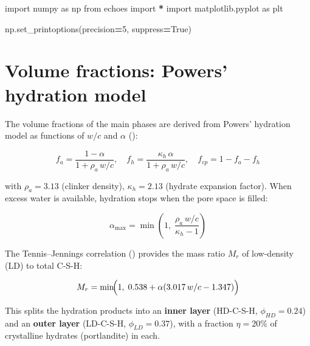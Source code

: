 \documentclass[
  a4paper,
  numbers=noendperiod,
  DIV=12]{scrreprt}
\newenvironment{Shaded}{\begin{snugshade}}{\end{snugshade}}
\newcommand{\DecValTok}[1]{\textcolor[rgb]{0.00,0.00,0.81}{#1}}
\newcommand{\ImportTok}[1]{#1}
\newcommand{\NormalTok}[1]{#1}
\newcommand{\OperatorTok}[1]{\textcolor[rgb]{0.81,0.36,0.00}{\textbf{#1}}}
\newcommand{\VariableTok}[1]{\textcolor[rgb]{0.00,0.00,0.00}{#1}}
\begin{document}
\begin{tcolorbox}[enhanced jigsaw, arc=.35mm, bottomrule=.15mm, bottomtitle=1mm, breakable, colback=white, colbacktitle=quarto-callout-tip-color!10!white, colframe=quarto-callout-tip-color-frame, coltitle=black, left=2mm, leftrule=.75mm, opacityback=0, opacitybacktitle=0.6, rightrule=.15mm, title={Imports}, titlerule=0mm, toprule=.15mm, toptitle=1mm]

\begin{Shaded}
\begin{Highlighting}[]
\ImportTok{import}\NormalTok{ numpy }\ImportTok{as}\NormalTok{ np}
\ImportTok{from}\NormalTok{ echoes }\ImportTok{import} \OperatorTok{*}
\ImportTok{import}\NormalTok{ matplotlib.pyplot }\ImportTok{as}\NormalTok{ plt}

\NormalTok{np.set\_printoptions(precision}\OperatorTok{=}\DecValTok{5}\NormalTok{, suppress}\OperatorTok{=}\VariableTok{True}\NormalTok{)}
\end{Highlighting}
\end{Shaded}

\end{tcolorbox}

\section{Volume fractions: Powers' hydration model}\label{sec-powers-vf}

The volume fractions of the main phases are derived from Powers'
hydration model as functions of \(w/c\) and \(\alpha\)
():

\[
f_a = \frac{1-\alpha}{1+\rho_a\,w/c}, \quad
f_h = \frac{\kappa_h\,\alpha}{1+\rho_a\,w/c}, \quad
f_{cp} = 1 - f_a - f_h
\]

with \(\rho_a=3.13\) (clinker density), \(\kappa_h=2.13\) (hydrate
expansion factor). When excess water is available, hydration stops when
the pore space is filled:

\[
\alpha_{\max} = \min\!\left(1,\;\frac{\rho_a\,w/c}{\kappa_h-1}\right)
\]

The Tennis--Jennings correlation () provides the mass ratio \(M_r\) of low-density (LD) to
total C-S-H:

\[
M_r = \min\!\Bigl(1,\;0.538 + \alpha(3.017\,w/c - 1.347)\Bigr)
\]

This splits the hydration products into an \textbf{inner layer}
(HD-C-S-H, \(\phi_{HD}=0.24\)) and an \textbf{outer layer} (LD-C-S-H,
\(\phi_{LD}=0.37\)), with a fraction \(\eta=20\%\) of crystalline
hydrates (portlandite) in each.
\end{document}
